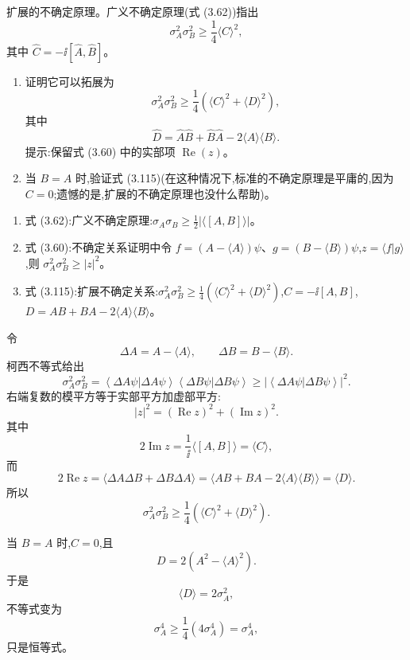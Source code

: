 \begin{question}
扩展的不确定原理。广义不确定原理(式 (3.62))指出
\[
\sigma_A^2\sigma_B^2\geq \frac14\langle C\rangle^2,
\]
其中 $\hat C=-\ii[\hat A,\hat B]$。
\begin{enumerate}
\item 证明它可以拓展为
\[
\sigma_A^2\sigma_B^2\geq \frac14\left(\langle C\rangle^2+\langle D\rangle^2\right),\tag{3.115}
\]
其中
\[
\hat D=\hat A\hat B+\hat B\hat A-2\langle A\rangle\langle B\rangle.
\]
提示:保留式 (3.60) 中的实部项 $\operatorname{Re}(z)$。
\item 当 $B=A$ 时,验证式 (3.115)(在这种情况下,标准的不确定原理是平庸的,因为 $C=0$;遗憾的是,扩展的不确定原理也没什么帮助)。
\end{enumerate}

\par\smallskip
{}
\begin{enumerate}[leftmargin=2.2em,itemsep=0.12em,topsep=0.12em,parsep=0pt]
\item 式 (3.62):广义不确定原理:$\sigma_A\sigma_B\ge \frac12|\langle[A,B]\rangle|$。
\item 式 (3.60):不确定关系证明中令 $f=(A-\langle A\rangle)\psi$、$g=(B-\langle B\rangle)\psi$,$z=\langle f|g\rangle$,则 $\sigma_A^2\sigma_B^2\ge |z|^2$。
\item 式 (3.115):扩展不确定关系:$\sigma_A^2\sigma_B^2\ge\frac14(\langle C\rangle^2+\langle D\rangle^2)$,$C=-\ii[A,B]$,$D=AB+BA-2\langle A\rangle\langle B\rangle$。
\end{enumerate}

\begin{solution}
令
\[
\Delta A=A-\langle A\rangle,
\qquad
\Delta B=B-\langle B\rangle.
\]
柯西不等式给出
\[
\sigma_A^2\sigma_B^2
=\left\langle \Delta A\psi|\Delta A\psi \right\rangle\left\langle \Delta B\psi|\Delta B\psi \right\rangle
\ge |\left\langle \Delta A\psi|\Delta B\psi \right\rangle|^2.
\]
右端复数的模平方等于实部平方加虚部平方:
\[
|z|^2=(\operatorname{Re}z)^2+(\operatorname{Im}z)^2.
\]
其中
\[
2\operatorname{Im}z=\frac1\ii\langle[A,B]\rangle=\langle C\rangle,
\]
而
\[
2\operatorname{Re}z
=\langle\Delta A\Delta B+\Delta B\Delta A\rangle
=\langle AB+BA-2\langle A\rangle\langle B\rangle\rangle
=\langle D\rangle.
\]
所以
\[
\boxed{\sigma_A^2\sigma_B^2\ge
\frac14\left(\langle C\rangle^2+\langle D\rangle^2\right).}
\]

当 $B=A$ 时,$C=0$,且
\[
D=2(A^2-\langle A\rangle^2).
\]
于是
\[
\langle D\rangle=2\sigma_A^2,
\]
不等式变为
\[
\sigma_A^4\ge \frac14(4\sigma_A^4)=\sigma_A^4,
\]
只是恒等式。
\end{solution}
\end{question}

